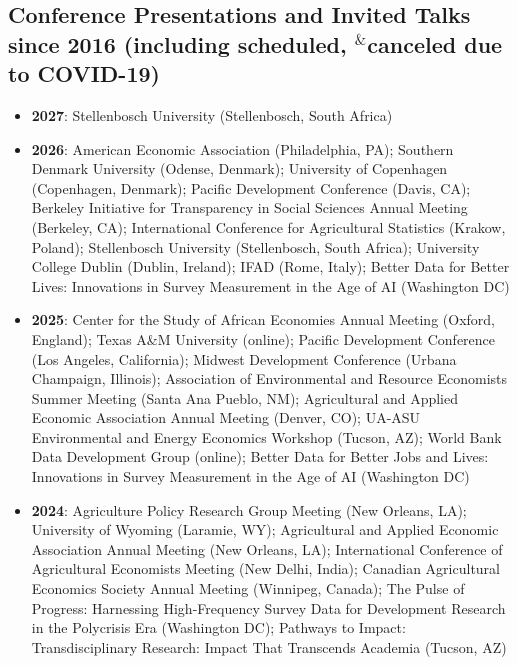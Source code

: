 \documentclass[letterpaper]{article}
\begin{document}
\subsection*{Conference Presentations and Invited Talks since 2016 \footnotesize (including scheduled, $^\&$canceled due to COVID-19)}

\begin{itemize}	

\item \textbf{2027}: Stellenbosch University (Stellenbosch, South Africa)

\item \textbf{2026}: American Economic Association (Philadelphia, PA); Southern Denmark University (Odense, Denmark); University of Copenhagen (Copenhagen, Denmark); Pacific Development Conference (Davis, CA); Berkeley Initiative for Transparency in Social Sciences Annual Meeting (Berkeley, CA); International Conference for Agricultural Statistics (Krakow, Poland); Stellenbosch University (Stellenbosch, South Africa); University College Dublin (Dublin, Ireland); IFAD (Rome, Italy);  Better Data for Better Lives: Innovations in Survey Measurement in the Age of AI (Washington DC)

\item \textbf{2025}: Center for the Study of African Economies Annual Meeting (Oxford, England); Texas A\&M University (online); Pacific Development Conference (Los Angeles, California); Midwest Development Conference (Urbana Champaign, Illinois); Association of Environmental and Resource Economists Summer Meeting (Santa Ana Pueblo, NM); Agricultural and Applied Economic Association Annual Meeting (Denver, CO); UA-ASU Environmental and Energy Economics Workshop (Tucson, AZ); World Bank Data Development Group (online); Better Data for Better Jobs and Lives: Innovations in Survey Measurement in the Age of AI (Washington DC)
	
\item \textbf{2024}: Agriculture Policy Research Group Meeting (New Orleans, LA); University of Wyoming (Laramie, WY); Agricultural and Applied Economic Association Annual Meeting (New Orleans, LA); International Conference of Agricultural Economists Meeting (New Delhi, India); Canadian Agricultural Economics Society Annual Meeting (Winnipeg, Canada); The Pulse of Progress: Harnessing High-Frequency Survey Data for Development Research in the Polycrisis Era (Washington DC); Pathways to Impact: Transdisciplinary Research: Impact That Transcends Academia (Tucson, AZ)


\end{itemize}
\end{document}
